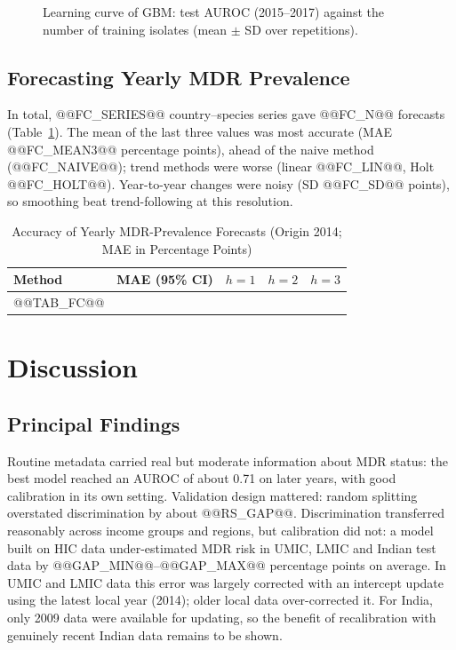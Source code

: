 \documentclass[conference]{IEEEtran}
\begin{document}
\begin{figure}[!t]
\centering

\caption{Learning curve of GBM: test AUROC (2015--2017) against the number of training isolates (mean $\pm$ SD over repetitions).}
\label{fig:lc}
\end{figure}

\subsection{Forecasting Yearly MDR Prevalence}
In total, @@FC_SERIES@@ country--species series gave @@FC_N@@ forecasts (Table~\ref{tab:fc}). The mean of the last three values was most accurate (MAE @@FC_MEAN3@@ percentage points), ahead of the naive method (@@FC_NAIVE@@); trend methods were worse (linear @@FC_LIN@@, Holt @@FC_HOLT@@). Year-to-year changes were noisy (SD @@FC_SD@@ points), so smoothing beat trend-following at this resolution.

\begin{table}[!t]
\caption{Accuracy of Yearly MDR-Prevalence Forecasts (Origin 2014; MAE in Percentage Points)}\label{tab:fc}
\centering\scriptsize\setlength{\tabcolsep}{2.5pt}
\begin{tabular}{lcccc}
\toprule
Method & MAE (95\% CI) & $h{=}1$ & $h{=}2$ & $h{=}3$ \\
\midrule
@@TAB_FC@@
\bottomrule
\end{tabular}
\end{table}

\section{Discussion}\label{sec:discussion}
\subsection{Principal Findings}
Routine metadata carried real but moderate information about MDR status: the best model reached an AUROC of about 0.71 on later years, with good calibration in its own setting. Validation design mattered: random splitting overstated discrimination by about @@RS_GAP@@. Discrimination transferred reasonably across income groups and regions, but calibration did not: a model built on HIC data under-estimated MDR risk in UMIC, LMIC and Indian test data by @@GAP_MIN@@--@@GAP_MAX@@ percentage points on average. In UMIC and LMIC data this error was largely corrected with an intercept update using the latest local year (2014); older local data over-corrected it. For India, only 2009 data were available for updating, so the benefit of recalibration with genuinely recent Indian data remains to be shown.
\end{document}

